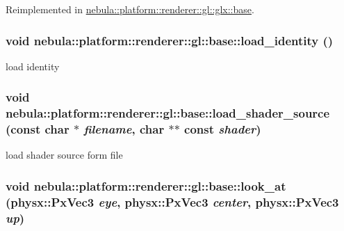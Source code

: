 Reimplemented in \hyperlink{classnebula_1_1platform_1_1renderer_1_1gl_1_1glx_1_1base_a111905577043b961ebf0f7111e8ec998}{nebula::platform::renderer::gl::glx::base}.\hypertarget{classnebula_1_1platform_1_1renderer_1_1gl_1_1base_a94365e0a4b2c11d16fb8c59d5fbbe1a0}{
\subsubsection[{load\_\-identity}]{\setlength{\rightskip}{0pt plus 5cm}void nebula::platform::renderer::gl::base::load\_\-identity ()}}
\label{classnebula_1_1platform_1_1renderer_1_1gl_1_1base_a94365e0a4b2c11d16fb8c59d5fbbe1a0}


load identity \hypertarget{classnebula_1_1platform_1_1renderer_1_1gl_1_1base_aad2760b695c0972220d27f184f723ed2}{
\subsubsection[{load\_\-shader\_\-source}]{\setlength{\rightskip}{0pt plus 5cm}void nebula::platform::renderer::gl::base::load\_\-shader\_\-source (const char $\ast$ {\em filename}, \/  char $\ast$$\ast$ const {\em shader})}}
\label{classnebula_1_1platform_1_1renderer_1_1gl_1_1base_aad2760b695c0972220d27f184f723ed2}


load shader source form file \hypertarget{classnebula_1_1platform_1_1renderer_1_1gl_1_1base_a9409d2f85fd5b8ceb9aa159f557a77c4}{
\subsubsection[{look\_\-at}]{\setlength{\rightskip}{0pt plus 5cm}void nebula::platform::renderer::gl::base::look\_\-at (physx::PxVec3 {\em eye}, \/  physx::PxVec3 {\em center}, \/  physx::PxVec3 {\em up})}}
\label{classnebula_1_1platform_1_1renderer_1_1gl_1_1base_a9409d2f85fd5b8ceb9aa159f557a77c4}


